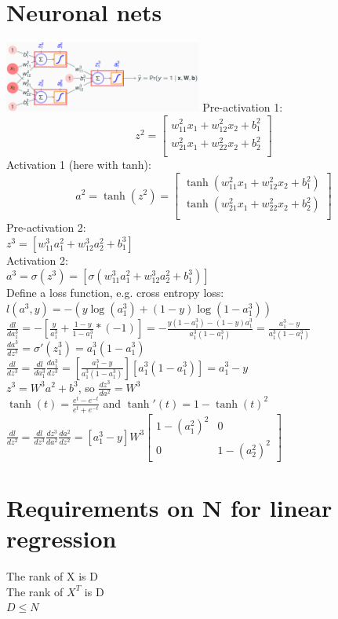 \section{Neuronal nets}
\includegraphics[width=65mm]{sections/assets/perceptron}
Pre-activation 1:
\[
	z^{2}=\left[
	\begin{matrix}
		w_{11}^{2}x_{1}+ w_{12}^{2}x_{2}+ b_{1}^{2} \\
		w_{21}^{2}x_{1}+ w_{22}^{2}x_{2}+ b_{2}^{2} \\
	\end{matrix}\right]
\]
Activation 1 (here with tanh):
\[
	a^{2}= \tanh(z^{2})=\left[
	\begin{matrix}
		\tanh(w_{11}^{2}x_{1}+ w_{12}^{2}x_{2}+ b_{1}^{2}) \\
		\tanh(w_{21}^{2}x_{1}+ w_{22}^{2}x_{2}+ b_{2}^{2}) \\
	\end{matrix}\right]
\]
Pre-activation 2:\\
$z^{3}=[w_{11}^{3}a_{1}^{2}+ w_{12}^{3}a_{2}^{2}+ b_{1}^{3}]$\\ Activation 2:\\ $a
^{3}=\sigma(z^{3})=[\sigma(w_{11}^{3}a_{1}^{2}+ w_{12}^{3}a_{2}^{2}+ b_{1}^{3})]$\\
Define a loss function, e.g. cross entropy loss: $l(a^{3}, y) = -(y \log(a_{1}^{3}
) + (1-y)\log(1-a_{1}^{3}))$\\
$\frac{dl}{da_{1}^{3}}=-\left[\frac{y}{a_{1}^{3}}+\frac{1-y}{1-a_{1}^{3}}*(-1)\right
]=-\frac{y(1-a_{1}^{3})-(1-y)a_{1}^{3}}{a_{1}^{3}(1-a_{1}^{3})}=\frac{a_{1}^{3}-
y}{a_{1}^{3}(1-a_{1}^{3})}$\\ $\frac{da^{3}}{dz^{3}}=\sigma'(z_{1}^{3})=a_{1}^{3}
(1 - a_{1}^{3})$\\
$\frac{dl}{dz^{3}}=\frac{dl}{da_{1}^{3}}\frac{da_{1}^{3}}{dz^{3}}=\left[ \frac{a_{1}^{3}-
y}{a_{1}^{3}(1-a_{1}^{3})}\right] \left[ a_{1}^{3}(1 - a_{1}^{3}) \right] = a_{1}
^{3}- y$\\ $z^{3}=W^{3}a^{2}+b^{3}$, so $\frac{dz^{3}}{da^{2}}=W^{3}$\\ $\tanh(t
)=\frac{e^{t}-e^{-t}}{e^{t}+e^{-t}}$ and $\tanh'(t)=1-\tanh(t)^{2}$\\
$\frac{dl}{dz^{2}}=\frac{dl}{dz^{3}}\frac{dz^{3}}{da^{2}}\frac{da^{2}}{dz^{2}}=[a
_{1}^{3}-y]W^{3}\left[
\begin{matrix}
	1-(a_{1}^{2})^{2} & 0                 \\
	0                 & 1-(a_{2}^{2})^{2}
\end{matrix}
\right]$
\section{Requirements on N for linear regression}
The rank of X is D\\ The rank of $X^{T}$ is D\\ $D \leq N$\\
